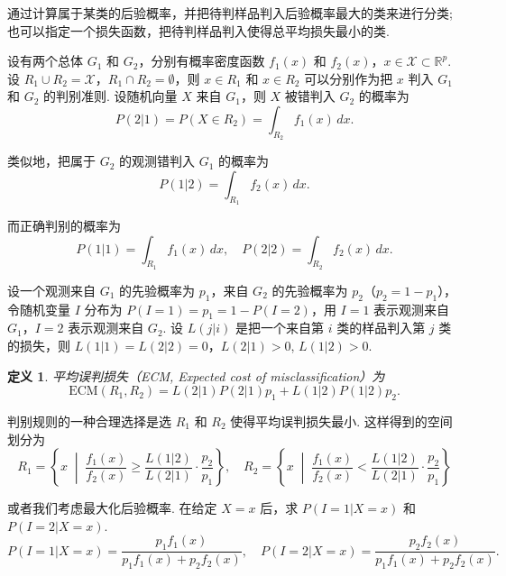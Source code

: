 \documentclass[12pt, a4paper, oneside]{ctexart}
\newtheorem{definition}[theorem]{定义}
\begin{document}
	通过计算属于某类的后验概率，并把待判样品判入后验概率最大的类来进行分类; 也可以指定一个损失函数，把待判样品判入使得总平均损失最小的类.
	
	设有两个总体 $G_1$ 和 $G_2$，分别有概率密度函数 $f_1(x)$ 和 $f_2(x)$，$x \in \mathcal{X} \subset \mathbb{R}^p$. 设 $R_1 \cup R_2 = \mathcal{X}$，$R_1 \cap R_2 = \emptyset$，则 $x \in R_1$ 和 $x \in R_2$ 可以分别作为把 $x$ 判入 $G_1$ 和 $G_2$ 的判别准则.
	设随机向量 $X$ 来自 $G_1$，则 $X$ 被错判入 $G_2$ 的概率为
	\begin{equation}
		P(2|1) = P(X \in R_2) = \int_{R_2} f_1(x) \, dx.\label{p21}
	\end{equation}
	
	类似地，把属于 $G_2$ 的观测错判入 $G_1$ 的概率为
	\begin{equation}
		P(1|2) = \int_{R_1} f_2(x) \, dx.\label{p12}
	\end{equation}
	
	而正确判别的概率为
	\begin{equation}
		P(1|1) = \int_{R_1} f_1(x) \, dx, \quad
		P(2|2) = \int_{R_2} f_2(x) \, dx.\label{correct}
	\end{equation}
	
	
	设一个观测来自 $G_1$ 的先验概率为 $p_1$，来自 $G_2$ 的先验概率为 $p_2$（$p_2 = 1 - p_1$），令随机变量 $I$ 分布为 $P(I = 1) = p_1 = 1 - P(I = 2)$，用 $I = 1$ 表示观测来自 $G_1$，$I = 2$ 表示观测来自 $G_2$. 设 $L(j|i)$ 是把一个来自第 $i$ 类的样品判入第 $j$ 类的损失，则 $L(1|1) = L(2|2) = 0$，$L(2|1) > 0$, $L(1|2) > 0$.
	
	\begin{definition}
		平均误判损失（ECM, Expected cost of misclassification）为
		\begin{equation}
			\mathrm{ECM}(R_1, R_2) = L(2|1)P(2|1)p_1 + L(1|2)P(1|2)p_2.\label{ECM}
		\end{equation}
		
		
	\end{definition}
	
	判别规则的一种合理选择是选 $R_1$ 和 $R_2$ 使得平均误判损失最小. 这样得到的空间划分为
	\[
	R_1 = \left\{ x \;\middle|\; \frac{f_1(x)}{f_2(x)} \geq \frac{L(1|2)}{L(2|1)} \cdot \frac{p_2}{p_1} \right\},
	\quad
	R_2 = \left\{ x \;\middle|\; \frac{f_1(x)}{f_2(x)} < \frac{L(1|2)}{L(2|1)} \cdot \frac{p_2}{p_1} \right\}
	\]
	
	或者我们考虑最大化后验概率. 在给定 $X = x$ 后，求 $P(I = 1|X = x)$ 和 $P(I = 2|X = x)$.
	\begin{equation}
		P(I = 1|X = x) = \frac{p_1 f_1(x)}{p_1 f_1(x) + p_2 f_2(x)},
		\quad
		P(I = 2|X = x) = \frac{p_2 f_2(x)}{p_1 f_1(x) + p_2 f_2(x)}.\label{postpro}
	\end{equation}
	
\end{document}
